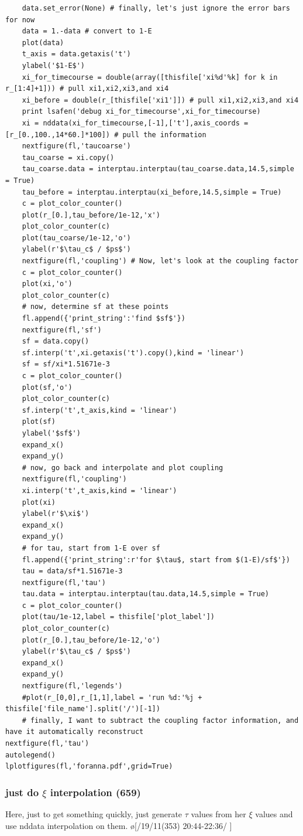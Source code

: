 \begin{lstlisting}
    data.set_error(None) # finally, let's just ignore the error bars for now
    data = 1.-data # convert to 1-E
    plot(data)
    t_axis = data.getaxis('t')
    ylabel('$1-E$')
    xi_for_timecourse = double(array([thisfile['xi%d'%k] for k in r_[1:4]+1])) # pull xi1,xi2,xi3,and xi4
    xi_before = double(r_[thisfile['xi1']]) # pull xi1,xi2,xi3,and xi4
    print lsafen('debug xi_for_timecourse',xi_for_timecourse)
    xi = nddata(xi_for_timecourse,[-1],['t'],axis_coords = [r_[0.,100.,14*60.]*100]) # pull the information
    nextfigure(fl,'taucoarse')
    tau_coarse = xi.copy()
    tau_coarse.data = interptau.interptau(tau_coarse.data,14.5,simple = True)
    tau_before = interptau.interptau(xi_before,14.5,simple = True)
    c = plot_color_counter()
    plot(r_[0.],tau_before/1e-12,'x')
    plot_color_counter(c)
    plot(tau_coarse/1e-12,'o')
    ylabel(r'$\tau_c$ / $ps$')
    nextfigure(fl,'coupling') # Now, let's look at the coupling factor
    c = plot_color_counter()
    plot(xi,'o')
    plot_color_counter(c)
    # now, determine sf at these points
    fl.append({'print_string':'find $sf$'})
    nextfigure(fl,'sf')
    sf = data.copy()
    sf.interp('t',xi.getaxis('t').copy(),kind = 'linear')
    sf = sf/xi*1.51671e-3
    c = plot_color_counter()
    plot(sf,'o')
    plot_color_counter(c)
    sf.interp('t',t_axis,kind = 'linear')
    plot(sf)
    ylabel('$sf$')
    expand_x()
    expand_y()
    # now, go back and interpolate and plot coupling
    nextfigure(fl,'coupling')
    xi.interp('t',t_axis,kind = 'linear')
    plot(xi)
    ylabel(r'$\xi$')
    expand_x()
    expand_y()
    # for tau, start from 1-E over sf
    fl.append({'print_string':r'for $\tau$, start from $(1-E)/sf$'})
    tau = data/sf*1.51671e-3
    nextfigure(fl,'tau')
    tau.data = interptau.interptau(tau.data,14.5,simple = True)
    c = plot_color_counter()
    plot(tau/1e-12,label = thisfile['plot_label'])
    plot_color_counter(c)
    plot(r_[0.],tau_before/1e-12,'o')
    ylabel(r'$\tau_c$ / $ps$')
    expand_x()
    expand_y()
    nextfigure(fl,'legends')
    #plot(r_[0,0],r_[1,1],label = 'run %d:'%j + thisfile['file_name'].split('/')[-1])
    # finally, I want to subtract the coupling factor information, and have it automatically reconstruct
nextfigure(fl,'tau')
autolegend()
lplotfigures(fl,'foranna.pdf',grid=True)
\end{lstlisting}
\subsubsection{just do $\xi$ interpolation (659)}\label{sec:writeup_software_examples_justinterp}
Here, just to get something quickly, just generate $\tau$ values from her $\xi$ values and use nddata interpolation on them.
\o[/19/11(353) 20:44-22:36\obsts/ \obstd]{}

